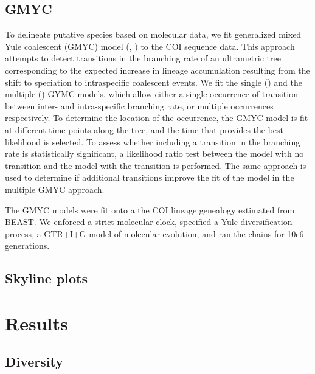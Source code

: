 \documentclass{article}\usepackage[]{graphicx}\usepackage[]{color}
\begin{document}
\subsection{GMYC}
To delineate putative species based on molecular data, we fit generalized mixed
Yule coalescent (GMYC) model (\cite{Pons2006}, \cite{Monaghan2009a}) to the COI
sequence data. This approach attempts to detect transitions in the branching
rate of an ultrametric tree corresponding to the expected increase in lineage
accumulation resulting from the shift to speciation to intraspecific coalescent
events. We fit the single (\cite{Pons2006}) and the multiple
(\cite{Monaghan2009a}) GYMC models, which allow either a single occurrence of
transition between inter- and intra-specific branching rate, or multiple
occurrences respectively. To determine the location of the occurrence, the GMYC
model is fit at different time points along the tree, and the time that provides
the best likelihood is selected. To assess whether including a transition in the
branching rate is statistically significant, a likelihood ratio test between the
model with no transition and the model with the transition is performed. The
same approach is used to determine if additional transitions improve the fit of
the model in the multiple GMYC approach.

The GMYC models were fit onto a the COI lineage genealogy estimated from
BEAST. We enforced a strict molecular clock, specified a Yule diversification
process, a GTR+I+G model of molecular evolution, and ran the chains for 10e6
generations. 



\subsection{Skyline plots}



\section{Results}

\subsection{Diversity}
\end{document}

